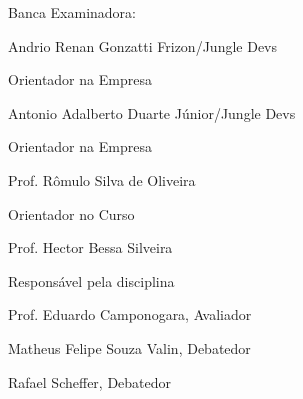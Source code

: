 
%
% 
%
\begin{folhadeaprovacao}


\thispagestyle{empty}

{\large Banca Examinadora:}

\vspace{1.3cm}

\begin{flushright}

{\large Andrio Renan Gonzatti Frizon/Jungle Devs}

{\large Orientador na Empresa}

\vspace{1.2cm}

{\large Antonio Adalberto Duarte Júnior/Jungle Devs}

{\large Orientador na Empresa}

\vspace{1.2cm}
{\large Prof. Rômulo Silva de Oliveira}

{\large Orientador no Curso}

\vspace{1.2cm}
 
{\large Prof. Hector Bessa Silveira}

{\large Responsável pela disciplina}

\vspace{1cm}

{\large Prof. Eduardo Camponogara, Avaliador}

\vspace{0.8cm}

{\large Matheus Felipe Souza Valin, Debatedor}

\vspace{0.8cm}

{\large Rafael Scheffer, Debatedor}

\end{flushright}
  
\end{folhadeaprovacao}
